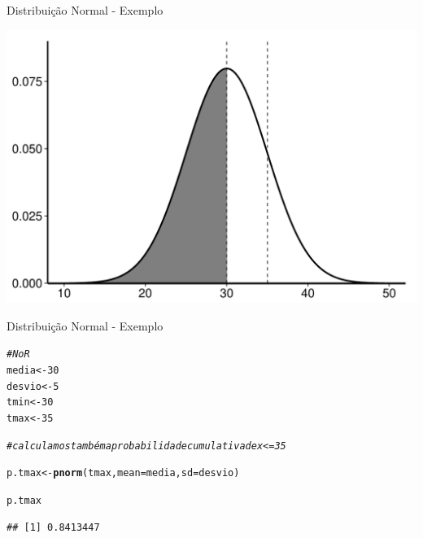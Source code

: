 \documentclass{beamer}\usepackage[]{graphicx}\usepackage[]{color}
\makeatletter
\def\maxwidth{ %
  \ifdim\Gin@nat@width>\linewidth
    \linewidth
  \else
    \Gin@nat@width
  \fi
}
\newcommand{\hlnum}[1]{\textcolor[rgb]{0.686,0.059,0.569}{#1}}%
\newcommand{\hlcom}[1]{\textcolor[rgb]{0.678,0.584,0.686}{\textit{#1}}}%
\newcommand{\hlstd}[1]{\textcolor[rgb]{0.345,0.345,0.345}{#1}}%
\newcommand{\hlkwb}[1]{\textcolor[rgb]{0.69,0.353,0.396}{#1}}%
\newcommand{\hlkwc}[1]{\textcolor[rgb]{0.333,0.667,0.333}{#1}}%
\newcommand{\hlkwd}[1]{\textcolor[rgb]{0.737,0.353,0.396}{\textbf{#1}}}%
\newenvironment{kframe}{%
 \def\at@end@of@kframe{}%
 \ifinner\ifhmode%
  \def\at@end@of@kframe{\end{minipage}}%
  \begin{minipage}{\columnwidth}%
 \fi\fi%
 \def\FrameCommand##1{\hskip\@totalleftmargin \hskip-\fboxsep
 \colorbox{shadecolor}{##1}\hskip-\fboxsep
     \hskip-\linewidth \hskip-\@totalleftmargin \hskip\columnwidth}%
 \MakeFramed {\advance\hsize-\width
   \@totalleftmargin\z@ \linewidth\hsize
   \@setminipage}}%
 {\par\unskip\endMakeFramed%
 \at@end@of@kframe}
\newenvironment{knitrout}{}{} %
\renewenvironment{knitrout}{\setlength{\topsep}{0mm}}{}
\makeatother
\begin{document}
\begin{frame}[fragile]{Distribuição Normal - Exemplo}

\begin{knitrout}
\color{fgcolor}
\includegraphics[width=\maxwidth,height=0.7\textheight]{figure/cumnormplot1-1} 

\end{knitrout}

\end{frame} 

\begin{frame}[fragile]{Distribuição Normal - Exemplo}


\begin{knitrout}\tiny
{}\color{fgcolor}\begin{kframe}
\begin{alltt}
\hlcom{# No R}
\hlstd{media} \hlkwb{<-} \hlnum{30}
\hlstd{desvio} \hlkwb{<-} \hlnum{5}
\hlstd{tmin} \hlkwb{<-} \hlnum{30}
\hlstd{tmax} \hlkwb{<-} \hlnum{35}

\hlcom{# calculamos também a probabilidade cumulativa de x <= 35}

\hlstd{p.tmax} \hlkwb{<-} \hlkwd{pnorm}\hlstd{(tmax,}\hlkwc{mean}\hlstd{=media,}\hlkwc{sd}\hlstd{=desvio)}

\hlstd{p.tmax}
\end{alltt}
\begin{verbatim}
## [1] 0.8413447
\end{verbatim}
\end{kframe}
\end{knitrout}

\end{frame} 
\end{document}
